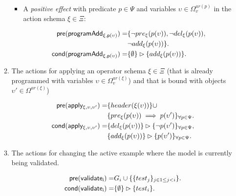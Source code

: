 \documentclass[letterpaper]{article} %
\newcommand{\pre}{\mathsf{pre}}     %
\newcommand{\cond}{\mathsf{cond}}   %
\begin{document}
\begin{itemize}
\begin{enumerate}
\begin{itemize}
\item A {\em positive effect} with predicate $p\in\Psi$ and variables $\upsilon\in\Omega_v^{ar(p)}$ in the action schema $\xi\in\Xi$:
\begin{small}
\begin{align*}
\hspace*{7pt}\pre(\mathsf{programAdd_{\xi,p(\upsilon)}})=&\{\neg pre_{\xi}(p(\upsilon)),\neg del_{\xi}(p(\upsilon)),\\
                                                     &\neg add_{\xi}(p(\upsilon))\}.\\                                                   
\cond(\mathsf{programAdd_{\xi,p(\upsilon)}})=&\{\emptyset\}\rhd\{add_{\xi}(p(\upsilon))\}.
\end{align*}
\end{small}
\end{itemize}

\item The actions for applying an operator schema $\xi\in\Xi$ (that is already programmed with variables $\upsilon\in\Omega_v^{ar(\xi)}$) and that is bound with objects $\upsilon'\in\Omega^{ar(\xi)}$)
\begin{small}
\begin{align*}
\hspace*{7pt}\pre(\mathsf{apply_{\xi,\upsilon,\upsilon'}})=&\{header(\xi(\upsilon))\}\cup\\     
                                           &\{pre_{\xi}(p(\upsilon))\implies p(\upsilon')\}_{\forall p\in\Psi}.\\
\cond(\mathsf{apply_{\xi,\upsilon,\upsilon'}})=&\{del_{\xi}(p(\upsilon))\}\rhd\{\neg p(\upsilon')\}_{\forall p\in\Psi},\\
&\{add_{\xi}(p(\upsilon))\}\rhd\{p(\upsilon')\}_{\forall p\in\Psi}.
\end{align*}
\end{small}

\item The actions for changing the active example where the model is currently being validated.
\begin{small}
\begin{align*}
\hspace*{7pt}\pre(\mathsf{validate_{i}})=&G_i\cup\{\{test_j\}_{j\in 1\leq j<i}\}.\\
\cond(\mathsf{validate_{i}})=&\{\emptyset\}\rhd\{test_i\}.
\end{align*}
\end{small}
\end{enumerate}
\end{itemize}
\end{document}
